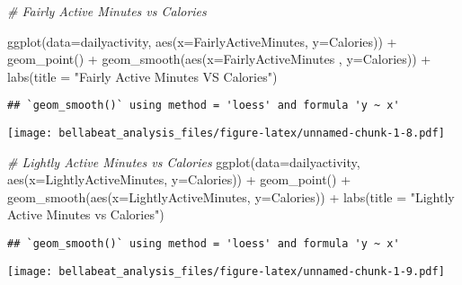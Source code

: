 \documentclass[
]{article}
\newenvironment{Shaded}{\begin{snugshade}}{\end{snugshade}}
\newcommand{\AttributeTok}[1]{\textcolor[rgb]{0.77,0.63,0.00}{#1}}
\newcommand{\CommentTok}[1]{\textcolor[rgb]{0.56,0.35,0.01}{\textit{#1}}}
\newcommand{\FunctionTok}[1]{\textcolor[rgb]{0.00,0.00,0.00}{#1}}
\newcommand{\NormalTok}[1]{#1}
\newcommand{\SpecialCharTok}[1]{\textcolor[rgb]{0.00,0.00,0.00}{#1}}
\newcommand{\StringTok}[1]{\textcolor[rgb]{0.31,0.60,0.02}{#1}}
\begin{document}
\begin{Shaded}
\begin{Highlighting}[]
\CommentTok{\# Fairly Active Minutes vs Calories}

\FunctionTok{ggplot}\NormalTok{(}\AttributeTok{data=}\NormalTok{dailyactivity, }\FunctionTok{aes}\NormalTok{(}\AttributeTok{x=}\NormalTok{FairlyActiveMinutes, }\AttributeTok{y=}\NormalTok{Calories)) }\SpecialCharTok{+}
  \FunctionTok{geom\_point}\NormalTok{() }\SpecialCharTok{+} 
  \FunctionTok{geom\_smooth}\NormalTok{(}\FunctionTok{aes}\NormalTok{(}\AttributeTok{x=}\NormalTok{FairlyActiveMinutes , }\AttributeTok{y=}\NormalTok{Calories)) }\SpecialCharTok{+}
  \FunctionTok{labs}\NormalTok{(}\AttributeTok{title =} \StringTok{"Fairly Active Minutes VS Calories"}\NormalTok{)}
\end{Highlighting}
\end{Shaded}

\begin{verbatim}
## `geom_smooth()` using method = 'loess' and formula 'y ~ x'
\end{verbatim}

\texttt{[image: bellabeat\_analysis\_files/figure-latex/unnamed-chunk-1-8.pdf]}

\begin{Shaded}
\begin{Highlighting}[]
\CommentTok{\# Lightly Active Minutes vs Calories}
\FunctionTok{ggplot}\NormalTok{(}\AttributeTok{data=}\NormalTok{dailyactivity, }\FunctionTok{aes}\NormalTok{(}\AttributeTok{x=}\NormalTok{LightlyActiveMinutes, }\AttributeTok{y=}\NormalTok{Calories)) }\SpecialCharTok{+}
  \FunctionTok{geom\_point}\NormalTok{() }\SpecialCharTok{+} 
  \FunctionTok{geom\_smooth}\NormalTok{(}\FunctionTok{aes}\NormalTok{(}\AttributeTok{x=}\NormalTok{LightlyActiveMinutes, }\AttributeTok{y=}\NormalTok{Calories)) }\SpecialCharTok{+}
  \FunctionTok{labs}\NormalTok{(}\AttributeTok{title =} \StringTok{"Lightly Active Minutes vs Calories"}\NormalTok{)}
\end{Highlighting}
\end{Shaded}

\begin{verbatim}
## `geom_smooth()` using method = 'loess' and formula 'y ~ x'
\end{verbatim}

\texttt{[image: bellabeat\_analysis\_files/figure-latex/unnamed-chunk-1-9.pdf]}
\end{document}
